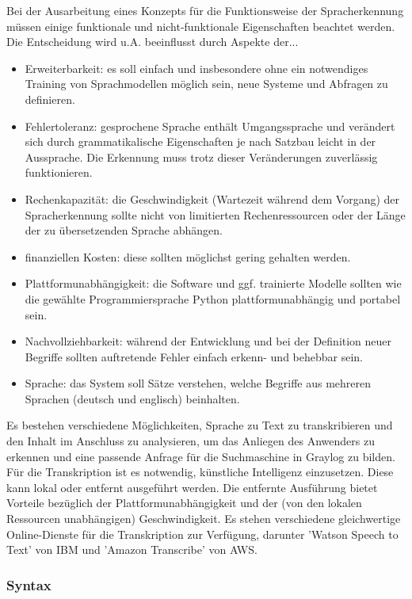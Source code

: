 Bei der Ausarbeitung eines Konzepts für die Funktionsweise der Spracherkennung müssen einige funktionale und nicht-funktionale Eigenschaften beachtet werden. Die Entscheidung wird u.A. beeinflusst durch Aspekte der... 

\begin{itemize}
\item Erweiterbarkeit: es soll einfach und insbesondere ohne ein notwendiges Training von Sprachmodellen möglich sein, neue Systeme und Abfragen zu definieren.
\item Fehlertoleranz: gesprochene Sprache enthält Umgangssprache und verändert sich durch grammatikalische Eigenschaften je nach Satzbau leicht in der Aussprache. Die Erkennung muss trotz dieser Veränderungen zuverlässig funktionieren.
\item Rechenkapazität: die Geschwindigkeit (Wartezeit während dem Vorgang) der Spracherkennung sollte nicht von limitierten Rechenressourcen oder der Länge der zu übersetzenden Sprache abhängen.
\item finanziellen Kosten: diese sollten möglichst gering gehalten werden.
\item Plattformunabhängigkeit: die Software und ggf. trainierte Modelle sollten wie die gewählte Programmiersprache Python plattformunabhängig und portabel sein.
\item Nachvollziehbarkeit: während der Entwicklung und bei der Definition neuer Begriffe sollten auftretende Fehler einfach erkenn- und behebbar sein.
\item Sprache: das System soll Sätze verstehen, welche Begriffe aus mehreren Sprachen (deutsch und englisch) beinhalten.
\end{itemize}

Es bestehen verschiedene Möglichkeiten, Sprache zu Text zu transkribieren und den Inhalt im Anschluss zu analysieren, um das Anliegen des Anwenders zu erkennen und eine passende Anfrage für die Suchmaschine in Graylog zu bilden. Für die Transkription ist es notwendig, künstliche Intelligenz einzusetzen. Diese kann lokal oder entfernt ausgeführt werden. Die entfernte Ausführung bietet Vorteile bezüglich der Plattformunabhängigkeit und der (von den lokalen Ressourcen unabhängigen) Geschwindigkeit. Es stehen verschiedene gleichwertige Online-Dienste für die Transkription zur Verfügung, darunter 'Watson Speech to Text' von IBM und 'Amazon Transcribe' von AWS.

\subsubsection{Syntax}
\label{sec:syntax}

